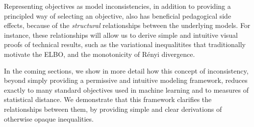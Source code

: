 \documentclass[twoside]{article}
\theoremstyle{plain}
\theoremstyle{definition}
\begin{document}
Representing objectives as model inconsistencies, in addition to providing a principled way of selecting an objective, also has beneficial pedagogical side effects, because of the \emph{structural} relationships between the underlying models.
For instance, these relationships will allow us to derive
simple and intuitive visual proofs of technical results,
such as the variational inequalitites that traditionally motivate the ELBO,
and the monotonicity of R\'enyi divergence.



In the coming sections, we show in more detail how this concept of inconsistency, beyond simply providing a permissive and intuitive modeling framework, reduces exactly to many standard objectives used in machine learning and to measures of statistical distance.
 We demonstrate that this framework clarifies the relationships between them, by providing simple and clear derivations of otherwise opaque inequalities.
\end{document}

